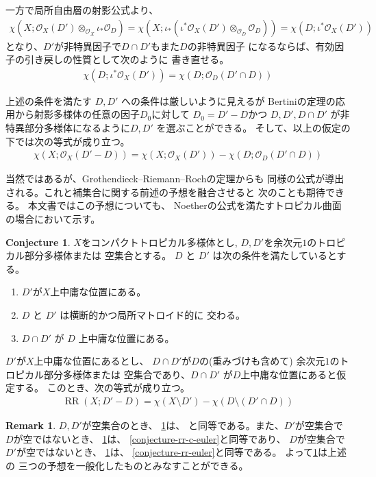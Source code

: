 \documentclass[a4paper,dvipdfmx,reqno,12pt]{amsart}
\theoremstyle{definition}
\newtheorem{conjecture}[theorem]{Conjecture}
\newtheorem{remark}[theorem]{Remark}
\newcommand{\opn}[1]{\operatorname{#1}}
\numberwithin{equation}{section}
\begin{document}
一方で局所自由層の射影公式より、
\begin{align}
\chi(X;\mathcal{O}_X(D')\otimes_{\mathcal{O}_X} \iota_*\mathcal{O}_D)
=\chi(X;\iota_*(\iota^{*}\mathcal{O}_X(D')\otimes_{\mathcal{O}_D} \mathcal{O}_D))
=\chi(D;\iota^{*}\mathcal{O}_X(D'))
\end{align}
となり、$D'$が非特異因子で$D\cap D'$もまた$D$の非特異因子
になるならば、有効因子の引き戻しの性質として次のように
書き直せる。
\begin{align}
\chi(D;\iota^{*}\mathcal{O}_X(D'))=\chi(D;\mathcal{O}_D(D'\cap D))
\end{align}

上述の条件を満たす $D,D'$ への条件は厳しいように見えるが
Bertiniの定理の応用から射影多様体の任意の因子$D_0$に対して
$D_0=D'-D$かつ
$D,D',D\cap D'$ が非特異部分多様体になるように$D,D'$
を選ぶことができる。
そして、以上の仮定の下では次の等式が成り立つ。
\begin{align}
\chi(X;\mathcal{O}_X(D'-D))=
\chi(X;\mathcal{O}_X(D'))-
\chi(D;\mathcal{O}_D(D'\cap D))
\end{align}

当然ではあるが、Grothendieck--Riemann--Rochの定理からも
同様の公式が導出される。これと補集合に関する前述の予想を融合させると
次のことも期待できる。
本文書ではこの予想についても、
Noetherの公式を満たすトロピカル曲面の場合において示す。
\begin{conjecture}
\label{conjecture-rr-bertini}
$X$をコンパクトトロピカル多様体とし, 
$D,D'$を余次元$1$のトロピカル部分多様体または
空集合とする。
$D$ と $D'$ は次の条件を満たしているとする。
\begin{enumerate}
\item $D'$が$X$上中庸な位置にある。
\item $D$ と $D'$ は横断的かつ局所マトロイド的に
交わる。
\item $D\cap D'$ が $D$ 上中庸な位置にある。
\end{enumerate}

$D'$が$X$上中庸な位置にあるとし、
$D\cap D'$が$D$の(重みづけも含めて)
余次元$1$のトロピカル部分多様体または
空集合であり、$D\cap D'$ が$D$上中庸な位置にあると仮定する。
このとき、次の等式が成り立つ。
\begin{align}
\opn{RR}(X;D'-D)=\chi (X\setminus D')-
\chi(D\setminus (D'\cap D))
\end{align}

\end{conjecture}

\begin{remark}
$D,D'$が空集合のとき、
\cref{conjecture-rr-bertini}は、
\cite[Conjecture 6.13]{demedrano2023chern}
と同等である。また、$D'$が空集合で$D$が空ではないとき、
\cref{conjecture-rr-bertini}は、
\cref{conjecture-rr-c-euler}と同等であり、
$D$が空集合で$D'$が空ではないとき、
\cref{conjecture-rr-bertini}は、
\cref{conjecture-rr-euler}と同等である。
よって\cref{conjecture-rr-bertini}は上述の
三つの予想を一般化したものとみなすことができる。
\end{remark}
\end{document}
